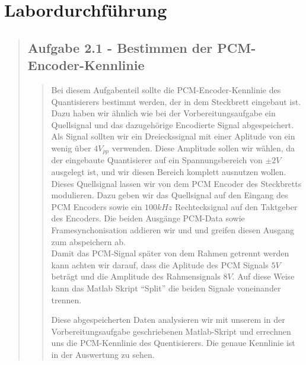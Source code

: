 
    
\section{Labordurchführung}
\begin{quote}

    \subsection{Aufgabe 2.1 - Bestimmen der PCM-Encoder-Kennlinie}
    \begin{quote}
         
         Bei diesem Aufgabenteil sollte die PCM-Encoder-Kennlinie des Quantisierers bestimmt werden, der in dem
         Steckbrett eingebaut ist. Dazu haben wir ähnlich wie bei der Vorbereitungsaufgabe ein Quellsignal und das
         dazugehörige Encodierte Signal abgespeichert.\\
         Als Signal sollten wir ein Dreieckssignal mit einer Aplitude von ein wenig über $4 V_{pp}$ verwenden. Diese
         Amplitude sollen wir wählen, da der eingebaute Quantisierer auf ein Spannungsbereich von $\pm 2 V$ ausgelegt
         ist, und wir diesen Bereich komplett ausnutzen wollen.\\
         Dieses Quellsignal lassen wir von dem PCM Encoder des Steckbretts modulieren. Dazu geben wir das Quellsignal
         auf den Eingang des PCM Encoders sowie ein $100 kHz$ Rechtecksignal auf den Taktgeber des Encoders. Die beiden
         Ausgänge PCM-Data sowie Framesynchonisation addieren wir und und greifen diesen Ausgang zum abspeichern ab.\\
         Damit das PCM-Signal später von dem Rahmen getrennt werden kann achten wir darauf, dass die Aplitude des PCM
         Signals $5 V$ beträgt und die Amplitude des Rahmensignals $8 V$. Auf diese Weise kann das Matlab Skript
         ``Split'' die beiden Signale voneinander trennen.
         
         Diese abgespeicherten Daten analysieren wir mit unserem in der Vorbereitungsaufgabe geschriebenen Matlab-Skript
         und errechnen uns die PCM-Kennlinie des Quentisierers. Die genaue Kennlinie ist in der Auswertung zu
         sehen.\vspace{1em}
         

\end{quote}
\end{quote}
